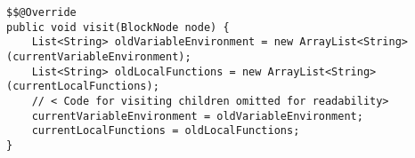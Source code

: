\begin{lstlisting}[caption={Code for visiting a block in the JasminCodeGeneratorVisitor}, label={code:JasminBlock}]
$$@Override
public void visit(BlockNode node) {
    List<String> oldVariableEnvironment = new ArrayList<String>(currentVariableEnvironment);
    List<String> oldLocalFunctions = new ArrayList<String>(currentLocalFunctions);
    // < Code for visiting children omitted for readability>
    currentVariableEnvironment = oldVariableEnvironment;
    currentLocalFunctions = oldLocalFunctions;
}
\end{lstlisting}